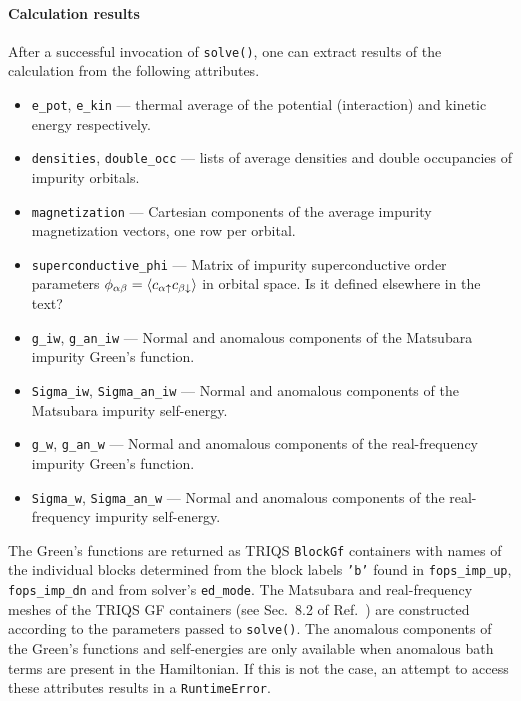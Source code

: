 \documentclass[edipack2.tex]{subfiles}
\begin{document}
\paragraph{{\bf Calculation results}}
After a successful invocation of {\tt solve()}, one can extract results of the 
calculation from the following attributes.
\begin{itemize}
    \item {\tt e\_pot}, {\tt e\_kin} --- thermal average of the potential 
          (interaction) and kinetic energy respectively.
    \item {\tt densities}, {\tt double\_occ} --- lists of average densities and
          double occupancies of impurity orbitals.
    \item {\tt magnetization} --- Cartesian components of the average impurity  
          magnetization vectors, one row per orbital.
    \item {\tt superconductive\_phi} --- Matrix of impurity superconductive
          order parameters
          $\phi_{\alpha\beta} = \langle c_{\alpha\uparrow} c_{\beta\downarrow}\rangle$
          in orbital space. {\color{red} Is it defined elsewhere in the text?}
    \item {\tt g\_iw}, {\tt g\_an\_iw} --- Normal and anomalous components of
          the Matsubara impurity Green's function.
    \item {\tt Sigma\_iw}, {\tt Sigma\_an\_iw} --- Normal and anomalous
          components of the Matsubara impurity self-energy.
    \item {\tt g\_w}, {\tt g\_an\_w} --- Normal and anomalous components of
          the real-frequency impurity Green's function.
    \item {\tt Sigma\_w}, {\tt Sigma\_an\_w} --- Normal and anomalous
          components of the real-frequency impurity self-energy.
\end{itemize}

The Green's functions are returned as TRIQS {\tt BlockGf} containers
with names of the individual blocks determined from the block labels {\tt 'b'}
found in {\tt fops\_imp\_up}, {\tt fops\_imp\_dn} and from solver's
{\tt ed\_mode}. The Matsubara and real-frequency meshes of the TRIQS GF 
containers (see Sec.~8.2 of Ref.~) are constructed
according to the parameters passed to {\tt solve()}.
The anomalous components of the Green's functions and self-energies are only 
available when anomalous bath terms are present in the Hamiltonian.
If this is not the case, an attempt to access these attributes results in a
{\tt RuntimeError}.
\end{document}
